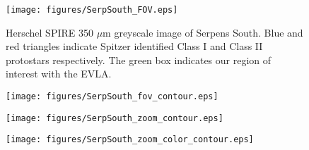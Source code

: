 \documentclass[apj]{emulateapj}
\begin{document}


\begin{figure}[h!]
\label{fig:serpsouth_fov}
\centering
\texttt{[image: figures/SerpSouth\_FOV.eps]}
\caption{\small{Herschel SPIRE 350 $\mu$m greyscale image of Serpens South. Blue and red triangles indicate Spitzer identified Class I and Class II protostars respectively. The green box indicates our region of interest with the EVLA.}}
\end{figure}

\begin{figure}[h!]
\label{fig:serpsouth_fov_contour}
\centering
\texttt{[image: figures/SerpSouth\_fov\_contour.eps]}
\caption{\small{ 
}}
\end{figure}

\begin{figure}[h!]
\label{fig:serpsouth_zoom_contour}
\centering
\texttt{[image: figures/SerpSouth\_zoom\_contour.eps]}
\caption{\small{ 
}}
\end{figure}

\begin{figure}[h!]
\label{fig:serpsouth_zoom_color_contour}
\centering
\texttt{[image: figures/SerpSouth\_zoom\_color\_contour.eps]}
\caption{\small{ 
}}
\end{figure}
\end{document}
